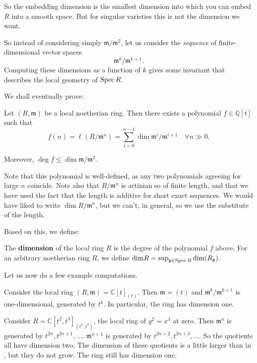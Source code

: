 So the embedding dimension is the smallest dimension into which you can embed
$R$ into a smooth space.
But for singular varieties this is not the dimension we want. 

So instead of considering simply $\mathfrak{m}/\mathfrak{m}^2$, let us
consider the \emph{sequence} of finite-dimensional vector spaces
\[ \mathfrak{m}^k/\mathfrak{m}^{k+1}.  \]
Computing these dimensions as a function of $k$ gives some invariant that describes the local
geometry of $\operatorname{Spec} R$.

We shall eventually prove:
\begin{theorem} \label{hilbfnispolynomial}
Let $(R, \mathfrak{m})$ be a local noetherian ring. Then there exists a
polynomial
$f \in \mathbb{Q}[t]$ such that
\[ f(n) =  \ell(R/\mathfrak{m}^n) = \sum_{i=0}^{n-1} \dim
\mathfrak{m}^i/\mathfrak{m}^{i+1} \quad \forall n \gg 0.  \]

Moreover, $\deg f \leq \dim \mathfrak{m}/\mathfrak{m}^2$.
\end{theorem}


Note that this polynomial is well-defined, as any two polynomials agreeing for large $n$
coincide. Note also that $R/\mathfrak{m}^n$ is artinian so of finite length,
and that we have used the fact that the length is additive for short exact
sequences. We would have liked to write $\dim R/\mathfrak{m}^n$, but we can't,
in general, so we use the substitute of the length. 

Based on this, we define:
\begin{definition} 
The \textbf{dimension} of the local ring $R$ is the degree of the polynomial
$f$ above. For an arbitrary noetherian ring $R$, we define $\mathrm{dim} R =
\sup_{\mathfrak{p} \in \operatorname{Spec} R} \mathrm{dim} (R_{\mathfrak{p}})$.
\end{definition} 


Let us now do a few example computations. 

\begin{example} \label{easydimcomputation}
\label{dimaffineline}
Consider the local ring $(R, \mathfrak{m}) = \mathbb{C}[t]_{(t)}$. Then $\mathfrak{m} = (t)$ and
$\mathfrak{m}^k/\mathfrak{m}^{k+1}$ is one-dimensional, generated by $t^k$. In
particular, the ring has dimension one. 
\end{example} 

\begin{example} Consider $R = \mathbb{C}[t^2, t^3]_{(t^2, t^3)}$, the local ring of $y^2 = x^3$
at zero. Then $\mathfrak{m}^n$ is generated by $t^{2n}, t^{2n+1}, \dots$.
$\mathfrak{m}^{n+1}$ is generated by $t^{2n+2}, t^{2n+3}, \dots$. So the
quotients all have dimension two. The dimension of these quotients is a little
larger than in , but they do not grow. The ring still has dimension one. 
\end{example} 

